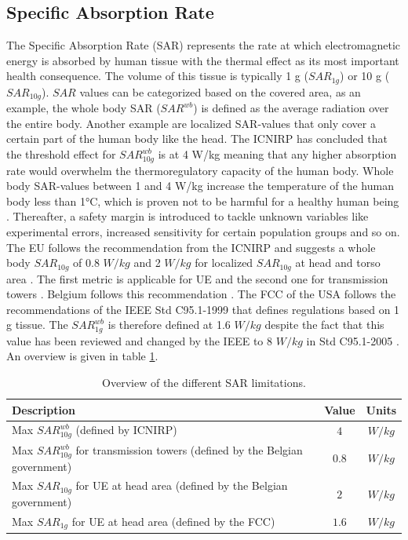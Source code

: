 \subsection{Specific Absorption Rate}
The Specific Absorption Rate (\gls{SAR}) represents the rate at which electromagnetic energy is 
absorbed by human tissue with the thermal effect as its most important health consequence.
The volume of this tissue is typically 1 g ($SAR_{1g}$) or 10 g ($SAR_{10g}$). 
$SAR$ values can be categorized based on the covered area, as an example, 
the whole body \gls{SAR} ($SAR^{wb}$) is defined as the average radiation over the entire body.
Another  example are localized \gls{SAR}-values that only cover a certain part of the human body like the head.
The \gls{ICNIRP} has concluded that the threshold effect for $SAR^{wb}_{10g}$ is at 4 W/kg meaning that any higher absorption 
rate would overwhelm the \gls{thermoregulatory capacity} of the human body.
Whole body \gls{SAR}-values between 1 and 4 W/kg increase the temperature of the human body less than 1°C, which is proven not to be harmful 
for a healthy human being \cite{J24,P2}.
Thereafter, a safety margin is introduced to tackle unknown variables like experimental errors, increased sensitivity for certain population groups and so on. 
The \gls{EU} follows the recommendation from the \gls{ICNIRP} \cite{J23} and 
suggests a whole body $SAR_{10g}$ of 0.8 $W/kg$ and 2 $W/kg$ for localized $SAR_{10g}$ at head and torso area \cite{J31_bioeffects,J30}. 
The first metric is applicable for \gls{UE} and the second one for transmission towers \cite{S20}.
Belgium follows this recommendation \cite{J23, S13_normenBelgie}.
The \gls{FCC} of the \gls{USA} follows the recommendations of the \gls{IEEE} Std C95.1-1999 \cite{P1,P2} that defines 
regulations based on 1 g tissue.
The $SAR^{wb}_{1g}$ is therefore defined at 1.6 $W/kg$ despite the fact that this value has been reviewed and changed by the \gls{IEEE} to 8 $W/kg$ in Std C95.1-2005 \cite{P2}.
An overview is given in table \ref{table:overviewSARValues}.

\begin{table}[h!]
\begin{tabular}{|l|c|c|}
\hline
\textbf{Description} & \textbf{Value} & \textbf{Units} \\ \hline
Max $SAR^{wb}_{10g}$ (defined by \gls{ICNIRP})                           &  $4$ & $W/kg$              \\ \hline
Max $SAR^{wb}_{10g}$ for transmission towers (defined by the Belgian government)                & $0.8$ & $W/kg$               \\ \hline
Max $SAR_{10g}$ for \acs{UE} at head area (defined by the Belgian government)                  & $2$ & $W/kg$               \\ \hline
Max $SAR_{1g}$ for \acs{UE} at head area (defined by the \gls{FCC})                  & $1.6$ & $W/kg$               \\ \hline
\end{tabular}
\caption{Overview of the different \acs{SAR} limitations.}
\label{table:overviewSARValues}
\end{table}

